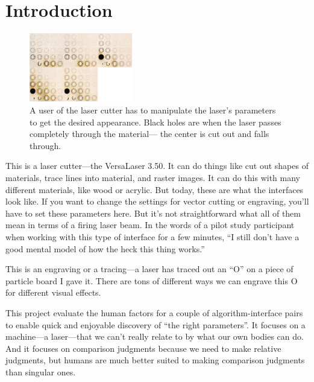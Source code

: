 \section{Introduction}

\begin{figure}
  \centering
  \includegraphics[width=0.4\textwidth]{figures/engravings}
  \caption{%
    A user of the laser cutter has to manipulate the laser's parameters to get the desired appearance.
    Black holes are when the laser passes completely through the material---
    the center is cut out and falls through.
  }\label{fig:rasters}
\end{figure}


This is a laser cutter---the VersaLaser 3.50.
It can do things like cut out shapes of materials, trace lines into material, and raster images.
It can do this with many different materials, like wood or acrylic.
But today, these are what the interfaces look like.
If you want to change the settings for vector cutting or engraving, you'll have to set these parameters here.
But it's not straightforward what all of them mean in terms of a firing laser beam. 
In the words of a pilot study participant when working with this type of interface for a few minutes, ``I still don't have a good mental model of how the heck this thing works.''

This is an engraving or a tracing---a laser has traced out an ``O'' on a piece of particle board I gave it.
There are tons of different ways we can engrave this O for different visual effects.

This project evaluate the human factors for a couple of algorithm-interface pairs to enable quick and enjoyable discovery of ``the right parameters''.
It focuses on a machine---a laser---that we can't really relate to by what our own bodies can do. 
And it focuses on comparison judgments because we need to make relative judgments, but humans are much better suited to making comparison judgments than singular ones.

